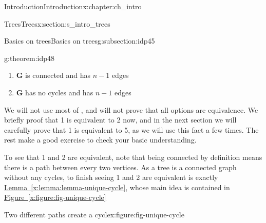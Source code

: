 \documentclass[oneside,10pt,]{book}
\newcommand{\xreffont}{\relax}
\numberwithin{equation}{section}
\newcommand{\bfG}{\mathbf{G}}
\begin{document}
\begin{chapterptx}{Introduction}{}{Introduction}{}{}{x:chapter:ch_intro}
\begin{sectionptx}{Trees}{}{Trees}{}{}{x:section:s_intro_trees}
\begin{subsectionptx}{Basics on trees}{}{Basics on trees}{}{}{g:subsection:idp45}
\begin{theorem}{}{}{g:theorem:idp48}
\begin{enumerate}
\item{}\(\bfG\) is connected and has \(n-1\) edges%
\item{}\(\bfG\) has no cycles and has \(n-1\) edges%
\end{enumerate}
\end{theorem}
We will not use most of , and will not prove that all options are equivalence.  We briefly proof that 1 is equivalent to 2 now, and in the next section we will carefully prove that 1 is equivalent to 5, as we will use this fact a few times.  The rest make a good exercise to check your basic understanding.%
\par
To see that 1 and 2 are equivalent, note that being connected by definition means there is a path between every two vertices.  As a tree is a connected graph without any cycles, to finish seeing 1 and 2 are equivalent is exactly \hyperref[x:lemma:lemma-unique-cycle]{Lemma~{\xreffont\ref{x:lemma:lemma-unique-cycle}}}, whose main idea is contained in \hyperref[x:figure:fig-unique-cycle]{Figure~{\xreffont\ref{x:figure:fig-unique-cycle}}}%
\begin{figureptx}{Two different paths create a cycle}{x:figure:fig-unique-cycle}{}%
\begin{image}{0.05}{0.9}{0.05}%
\end{image}
\end{figureptx}
\end{subsectionptx}
\end{sectionptx}
\end{chapterptx}
\end{document}
